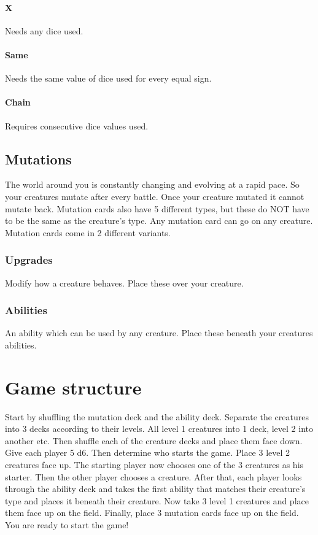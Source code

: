 \documentclass[a4paper,12pt]{article}
\begin{document}
\paragraph{X}
Needs any dice used.
\paragraph{Same}
Needs the same value of dice used for every equal sign.
\paragraph{Chain}
Requires consecutive dice values used.


\subsection{Mutations}
The world around you is constantly changing and evolving at a rapid pace.
So your creatures mutate after every battle.
Once your creature mutated it cannot mutate back.
Mutation cards also have 5 different types, but these do NOT have to be the same as the creature's type.
Any mutation card can go on any creature.
Mutation cards come in 2 different variants.
\subsubsection{Upgrades}
Modify how a creature behaves. Place these over your creature.
\subsubsection{Abilities}
An ability which can be used by any creature. Place these beneath your creatures abilities.

\section{Game structure}
Start by shuffling the mutation deck and the ability deck.
Separate the creatures into 3 decks according to their levels. All level 1 creatures into 1 deck, level 2 into another etc. Then shuffle each of the creature decks and place them face down.
Give each player 5 d6. Then determine who starts the game. 
Place 3 level 2 creatures face up. The starting player now chooses one of the 3 creatures as his starter. Then the other player chooses a creature.
After that, each player looks through the ability deck and takes the first ability that matches their creature's type and places it beneath their creature.
Now take 3 level 1 creatures and place them face up on the field. Finally, place 3 mutation cards face up on the field.
You are ready to start the game!
\end{document}
